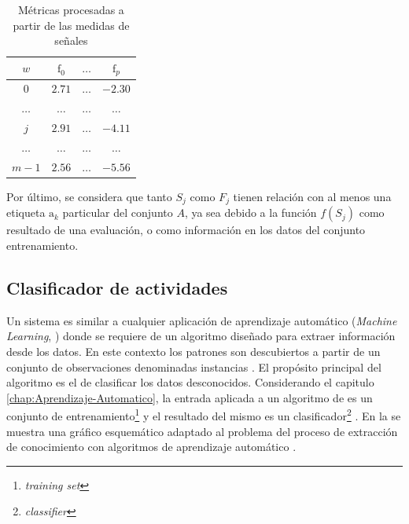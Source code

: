 \begin{table}[!tbph]
\begin{centering}
\begin{tabular}{|c|c|c|c|}
\hline 
$w$ & $\mathrm{f}_{0}$ & $\ldots$ & $\mathrm{f}_{p}$\tabularnewline
\hline 
\hline 
$0$ & $2.71$ & \texttt{$\ldots$} & \texttt{$-2.30$}\tabularnewline
\hline 
$\ldots$ & $\ldots$ & \texttt{$\ldots$} & \texttt{$\ldots$}\tabularnewline
\hline 
$j$ & $2.91$ & \texttt{$\ldots$} & \texttt{$-4.11$}\tabularnewline
\hline 
$\ldots$ & $\ldots$ & \texttt{$\ldots$} & \texttt{$\ldots$}\tabularnewline
\hline 
$m-1$ & $2.56$ & \texttt{$\ldots$} & \texttt{$-5.56$}\tabularnewline
\hline 
\end{tabular}
\par\end{centering}
\caption[Métricas de proceso de extracción]{\label{tab4:features}Métricas procesadas a partir de las medidas
de señales}
\end{table}

Por último, se considera que tanto $S_{j}$ como $F_{j\ensuremath{}}$
tienen relación con al menos una etiqueta $\mathrm{a}_{k}$ particular
del conjunto $A$, ya sea debido a la función $f(S_{j})$ como resultado
de una evaluación, o como información en los datos del conjunto entrenamiento.

\subsection{Clasificador de actividades }

\label{sec45:clasificador}Un sistema  es similar a cualquier
aplicación de aprendizaje automático (\emph{Machine Learning}, )
donde se requiere de un algoritmo diseñado para extraer información
desde los datos. En este contexto los patrones son descubiertos a
partir de un conjunto de observaciones denominadas instancias \cite{LaraLabrador2013}.
El propósito principal del algoritmo es el de clasificar los datos
desconocidos. Considerando el capitulo \ref{chap:Aprendizaje-Automatico},
la entrada aplicada a un algoritmo de  es un conjunto de
entrenamiento\footnote{\emph{training set}} y el resultado del mismo
es un clasificador\footnote{\emph{classifier}} \cite{Rajaraman2011}.
En la  se muestra una gráfico esquemático
adaptado al problema  del proceso de extracción de conocimiento
con algoritmos de aprendizaje automático \cite{Raschka2014}.

